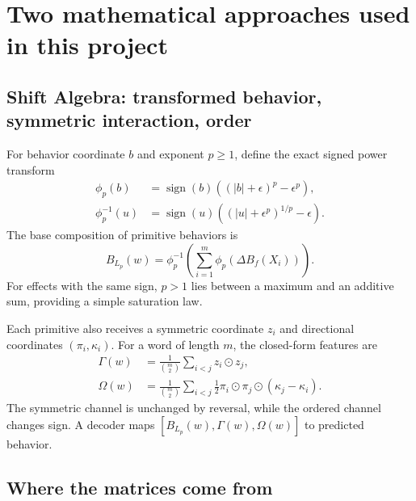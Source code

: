 \documentclass[11pt,a4paper]{article}
\newcommand{\sign}{\operatorname{sign}}
\begin{document}
\section{Two mathematical approaches used in this project}

\subsection{Shift Algebra: transformed behavior, symmetric interaction, order}

For behavior coordinate $b$ and exponent $p\geq 1$, define the exact signed
power transform
\begin{align}
\phi_p(b)&=\sign(b)\left((|b|+\epsilon)^p-\epsilon^p\right),\\
\phi_p^{-1}(u)&=\sign(u)
\left((|u|+\epsilon^p)^{1/p}-\epsilon\right).
\end{align}
The base composition of primitive behaviors is
\begin{equation}
B_{L_p}(w)=
\phi_p^{-1}\!\left(\sum_{i=1}^{m}\phi_p(\Delta B_f(X_i))\right).
\label{eq:lp}
\end{equation}
For effects with the same sign, $p>1$ lies between a maximum and an additive
sum, providing a simple saturation law.

Each primitive also receives a symmetric coordinate $z_i$ and directional
coordinates $(\pi_i,\kappa_i)$.  For a word of length $m$, the closed-form
features are
\begin{align}
\Gamma(w)&=\frac{1}{\binom{m}{2}}
\sum_{i<j}z_i\odot z_j,\\
\Omega(w)&=\frac{1}{\binom{m}{2}}
\sum_{i<j}\frac12\pi_i\odot\pi_j\odot
(\kappa_j-\kappa_i).
\label{eq:order}
\end{align}
The symmetric channel is unchanged by reversal, while the ordered channel
changes sign.  A decoder maps
$[B_{L_p}(w),\Gamma(w),\Omega(w)]$ to predicted behavior.

\subsection{Where the matrices come from}
\end{document}
